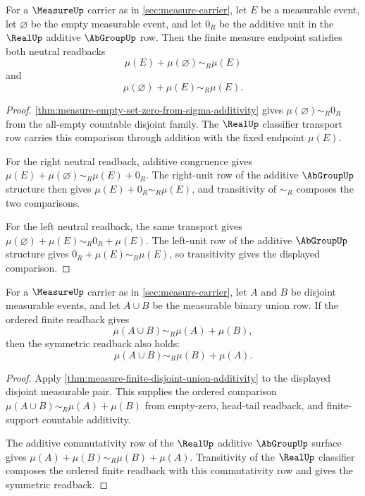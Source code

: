 \begin{theorem}
\label{thm:measure-null-event-addition-neutral}
For a $\MeasureUp$ carrier as in \autoref{sec:measure-carrier}, let $E$ be a
measurable event, let $\varnothing$ be the empty measurable event, and let
$0_R$ be the additive unit in the $\RealUp$ additive $\AbGroupUp$ row. Then
the finite measure endpoint satisfies both neutral readbacks
$$
\mu(E)+\mu(\varnothing)\sim_R\mu(E)
$$
and
$$
\mu(\varnothing)+\mu(E)\sim_R\mu(E).
$$
\end{theorem}
\begin{proof}
\autoref{thm:measure-empty-set-zero-from-sigma-additivity} gives
$\mu(\varnothing)\sim_R0_R$ from the all-empty countable disjoint family. The
$\RealUp$ classifier transport row carries this comparison through addition
with the fixed endpoint $\mu(E)$.

For the right neutral readback, additive congruence gives
$\mu(E)+\mu(\varnothing)\sim_R\mu(E)+0_R$. The right-unit row of the additive
$\AbGroupUp$ structure then gives $\mu(E)+0_R\sim_R\mu(E)$, and transitivity
of $\sim_R$ composes the two comparisons.

For the left neutral readback, the same transport gives
$\mu(\varnothing)+\mu(E)\sim_R0_R+\mu(E)$. The left-unit row of the additive
$\AbGroupUp$ structure gives $0_R+\mu(E)\sim_R\mu(E)$, so transitivity gives
the displayed comparison.
\end{proof}

\begin{theorem}
\label{thm:measure-finite-disjoint-union-symmetric-readback}
For a $\MeasureUp$ carrier as in \autoref{sec:measure-carrier}, let $A$ and
$B$ be disjoint measurable events, and let $A\cup B$ be the measurable binary
union row. If the ordered finite readback gives
$$
\mu(A\cup B)\sim_R\mu(A)+\mu(B),
$$
then the symmetric readback also holds:
$$
\mu(A\cup B)\sim_R\mu(B)+\mu(A).
$$
\end{theorem}
\begin{proof}
Apply \autoref{thm:measure-finite-disjoint-union-additivity} to the displayed
disjoint measurable pair. This supplies the ordered comparison
$\mu(A\cup B)\sim_R\mu(A)+\mu(B)$ from empty-zero, head-tail readback, and
finite-support countable additivity.

The additive commutativity row of the $\RealUp$ additive $\AbGroupUp$ surface
gives $\mu(A)+\mu(B)\sim_R\mu(B)+\mu(A)$. Transitivity of the $\RealUp$
classifier composes the ordered finite readback with this commutativity row
and gives the symmetric readback.
\end{proof}

